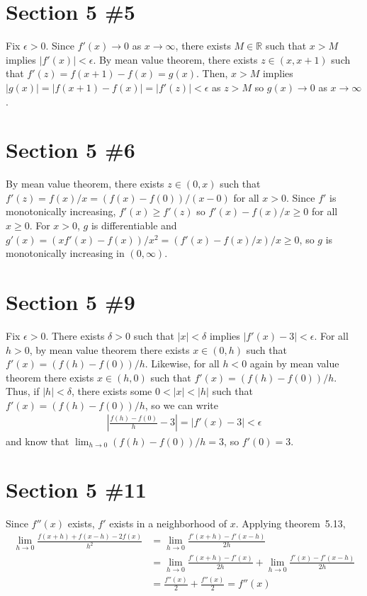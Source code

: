 \documentclass{scrartcl}
\begin{document}
\section{Section 5 \#5}
Fix \(\epsilon > 0\).
Since \(f'(x) \to 0\) as \(x \to \infty\), there exists \(M \in \mathbb{R}\) such that \(x > M\) implies \(|f'(x)| < \epsilon\).
By mean value theorem, there exists \(z \in (x, x + 1)\) such that \(f'(z) = f(x + 1) - f(x) = g(x)\).
Then, \(x > M\) implies \(|g(x)| = |f(x + 1) - f(x)| = |f'(z)| < \epsilon\) as \(z > M\) so \(g(x) \to 0\) as \(x \to \infty\).

\section{Section 5 \#6}
By mean value theorem, there exists \(z \in (0, x)\) such that \(f'(z) = f(x) / x = (f(x) - f(0)) / (x - 0)\) for all \(x > 0\).
Since \(f'\) is monotonically increasing, \(f'(x) \geq f'(z)\) so \(f'(x) - f(x) / x \geq 0\) for all \(x \geq 0\).
For \(x > 0\), \(g\) is differentiable and \(g'(x) = (xf'(x) - f(x)) / x^2 = (f'(x) - f(x) / x) / x \geq 0\), so \(g\) is monotonically increasing in \((0, \infty)\).

\section{Section 5 \#9}
Fix \(\epsilon > 0\).
There exists \(\delta > 0\) such that \(|x| < \delta\) implies \(|f'(x) - 3| < \epsilon\).
For all \(h > 0\), by mean value theorem there exists \(x \in (0, h)\) such that \(f'(x) = (f(h) - f(0)) / h\).
Likewise, for all \(h < 0\) again by mean value theorem there exists \(x \in (h, 0)\) such that \(f'(x) = (f(h) - f(0)) / h\).
Thus, if \(|h| < \delta\), there exists some \(0 < |x| < |h|\) such that \(f'(x) = (f(h) - f(0)) / h\), so we can write
\begin{align*}
  \left| \frac{f(h) - f(0)}{h} - 3 \right| = \left| f'(x) - 3 \right| < \epsilon
\end{align*}
and know that \(\lim_{h \to 0} (f(h) - f(0)) / h = 3\), so \(f'(0) = 3\).

\section{Section 5 \#11}
Since \(f''(x)\) exists, \(f'\) exists in a neighborhood of \(x\).
Applying theorem~5.13,
\begin{align*}
  \lim_{h \to 0} \frac{f(x + h) + f(x - h) - 2f(x)}{h^2}
  &= \lim_{h \to 0} \frac{f'(x + h) - f'(x - h)}{2h} \\
  &= \lim_{h \to 0} \frac{f'(x + h) - f'(x)}{2h} + \lim_{h \to 0} \frac{f'(x) - f'(x - h)}{2h} \\
  &= \frac{f''(x)}{2} + \frac{f''(x)}{2} = f''(x)
\end{align*}
\end{document}
